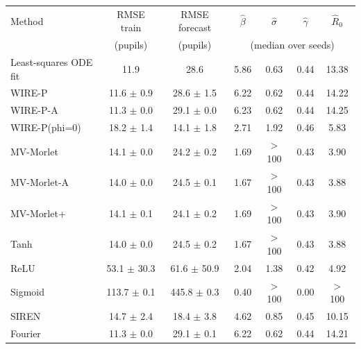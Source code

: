 \begin{tabular}{lcccccc}
\toprule
Method & RMSE train & RMSE forecast & $\hat\beta$ & $\hat\sigma$ & $\hat\gamma$ & $\hat R_0$ \\
& (pupils) & (pupils) & \multicolumn{4}{c}{(median over seeds)} \\
\midrule
Least-squares ODE fit & 11.9 & 28.6 & 5.86 & 0.63 & 0.44 & 13.38 \\
\midrule
WIRE-P & 11.6 $\pm$ 0.9 & 28.6 $\pm$ 1.5 & 6.22 & 0.62 & 0.44 & 14.22 \\
WIRE-P-A & 11.3 $\pm$ 0.0 & 29.1 $\pm$ 0.0 & 6.23 & 0.62 & 0.44 & 14.25 \\
WIRE-P(phi=0) & 18.2 $\pm$ 1.4 & 14.1 $\pm$ 1.8 & 2.71 & 1.92 & 0.46 & 5.83 \\
MV-Morlet & 14.1 $\pm$ 0.0 & 24.2 $\pm$ 0.2 & 1.69 & $>$100 & 0.43 & 3.90 \\
MV-Morlet-A & 14.0 $\pm$ 0.0 & 24.5 $\pm$ 0.1 & 1.67 & $>$100 & 0.43 & 3.88 \\
MV-Morlet+ & 14.1 $\pm$ 0.1 & 24.1 $\pm$ 0.2 & 1.69 & $>$100 & 0.43 & 3.90 \\
Tanh & 14.0 $\pm$ 0.0 & 24.5 $\pm$ 0.2 & 1.67 & $>$100 & 0.43 & 3.88 \\
ReLU & 53.1 $\pm$ 30.3 & 61.6 $\pm$ 50.9 & 2.04 & 1.38 & 0.42 & 4.92 \\
Sigmoid & 113.7 $\pm$ 0.1 & 445.8 $\pm$ 0.3 & 0.40 & $>$100 & 0.00 & $>$100 \\
SIREN & 14.7 $\pm$ 2.4 & 18.4 $\pm$ 3.8 & 4.62 & 0.85 & 0.45 & 10.15 \\
Fourier & 11.3 $\pm$ 0.0 & 29.1 $\pm$ 0.1 & 6.22 & 0.62 & 0.44 & 14.21 \\
\bottomrule
\end{tabular}